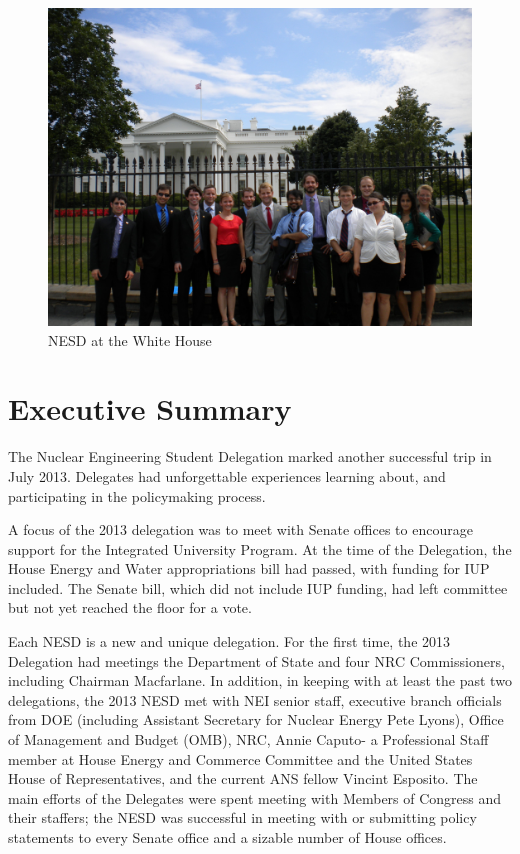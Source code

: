 \documentclass[12pt]{article}
\begin{document}
\begin{figure}[hbtp]
\centering
\caption{NESD at the White House}
\includegraphics*[scale=.4]{NESD_WH.jpg}
\end{figure}

\newpage

\section{Executive Summary}

The Nuclear Engineering Student Delegation marked another successful trip in
July 2013.  Delegates had unforgettable experiences learning about, and
participating in the policymaking process.

A focus of the 2013 delegation was to meet with Senate offices to encourage
support for the Integrated University Program.  At the time of the Delegation,
the House Energy and Water appropriations bill had passed, with funding for IUP
included.  The Senate bill, which did not include IUP funding, had left
committee but not yet reached the floor for a vote.

Each NESD is a new and unique delegation. For the first time, the 2013
Delegation had meetings the Department of State and four NRC Commissioners,
including Chairman Macfarlane.  In addition, in keeping with at least the past
two delegations, the 2013 NESD met with NEI senior staff, executive branch
officials from DOE (including Assistant Secretary for Nuclear Energy Pete
Lyons), Office of Management and Budget (OMB), NRC, Annie Caputo- a Professional
Staff member at House Energy and Commerce Committee and the United States House
of Representatives, and the current ANS fellow Vincint Esposito.  The main
efforts of the Delegates were spent meeting with Members of Congress and their
staffers; the NESD was successful in meeting with or submitting policy
statements to every Senate office and a sizable number of House offices.
\end{document}
